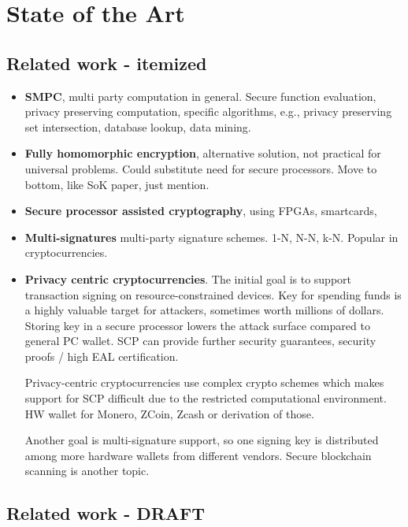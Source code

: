 \documentclass[
  digital, %
  twoside, %
  table,   %
  lof,     %
  lot,     %
]{fithesis3}
\newcounter{ph4_show_guides}
\theoremstyle{definition}
\theoremstyle{remark}
\begin{document}
\chapter{State of the Art}\label{chapter:soa}%
\begin{ecmmnt}  %
\section{Related work - itemized}
\begin{itemize}
    \item {\bf{SMPC}}, multi party computation in general. Secure function evaluation, privacy preserving computation, specific algorithms, e.g., privacy preserving set intersection, database lookup, data mining. 
    
    \item {\bf{Fully homomorphic encryption}}, alternative solution, not practical for universal problems. Could substitute need for secure processors. Move to bottom, like SoK paper, just mention.
    
    \item {\bf{Secure processor assisted cryptography}}, using FPGAs, smartcards, 
    
    \item {\bf{Multi-signatures}} multi-party signature schemes. 1-N, N-N, k-N. Popular in cryptocurrencies.
    
    \item {\bf{Privacy centric cryptocurrencies}}. The initial goal is to support transaction signing on resource-constrained devices. Key for spending funds is a highly valuable target for attackers, sometimes worth millions of dollars. Storing key in a secure processor lowers the attack surface compared to general PC wallet. SCP can provide further security guarantees, security proofs / high EAL certification. 
    
    Privacy-centric cryptocurrencies use complex crypto schemes which makes support for SCP difficult due to the restricted computational environment. HW wallet for Monero, ZCoin, Zcash or derivation of those. 
    
    Another goal is multi-signature support, so one signing key is distributed among more hardware wallets from different vendors. Secure blockchain scanning is another topic. 
\end{itemize}

\section{Related work - DRAFT}

\end{ecmmnt}
\end{document}
